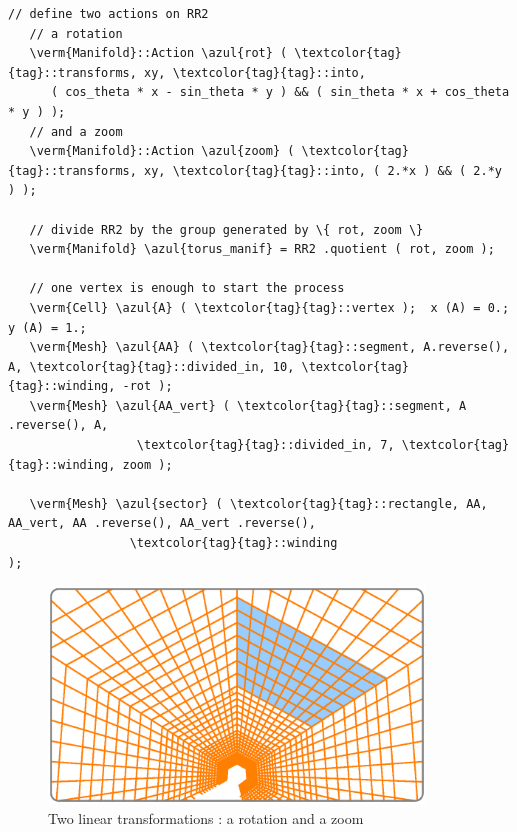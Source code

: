 \begin{Verbatim}[commandchars=\\\{\},formatcom=\small\tt,frame=single,
   label=parag-\ref{\numb section 7.\numb parag 15}.cpp,rulecolor=\color{coment},
   baselinestretch=0.94,framesep=2mm                                             ]
   // define two actions on RR2
   // a rotation
   \verm{Manifold}::Action \azul{rot} ( \textcolor{tag}{tag}::transforms, xy, \textcolor{tag}{tag}::into,
      ( cos_theta * x - sin_theta * y ) && ( sin_theta * x + cos_theta * y ) );
   // and a zoom
   \verm{Manifold}::Action \azul{zoom} ( \textcolor{tag}{tag}::transforms, xy, \textcolor{tag}{tag}::into, ( 2.*x ) && ( 2.*y ) );

   // divide RR2 by the group generated by \{ rot, zoom \}
   \verm{Manifold} \azul{torus_manif} = RR2 .quotient ( rot, zoom );

   // one vertex is enough to start the process
   \verm{Cell} \azul{A} ( \textcolor{tag}{tag}::vertex );  x (A) = 0.;  y (A) = 1.;
   \verm{Mesh} \azul{AA} ( \textcolor{tag}{tag}::segment, A.reverse(), A, \textcolor{tag}{tag}::divided_in, 10, \textcolor{tag}{tag}::winding, -rot );
   \verm{Mesh} \azul{AA_vert} ( \textcolor{tag}{tag}::segment, A .reverse(), A,
                  \textcolor{tag}{tag}::divided_in, 7, \textcolor{tag}{tag}::winding, zoom );

   \verm{Mesh} \azul{sector} ( \textcolor{tag}{tag}::rectangle, AA, AA_vert, AA .reverse(), AA_vert .reverse(),
                 \textcolor{tag}{tag}::winding                                                   );
\end{Verbatim}
  
\begin{figure}[ht] \centering
  \includegraphics[width=100mm]{sector-3.eps}
  \caption{Two linear transformations : a rotation and a zoom}
  \label{\numb section 7.\numb fig 11}
\end{figure}

